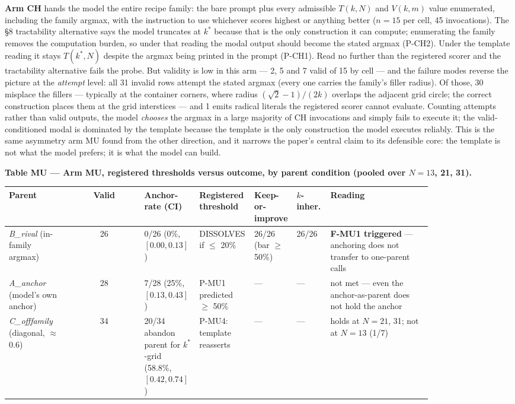 \textbf{Arm CH} hands the model the entire recipe family: the bare prompt plus every admissible
$T(k, N)$ and $V(k, m)$ value enumerated, including the family argmax, with the instruction to
use whichever scores highest or anything better ($n = 15$ per cell, 45 invocations). The \S8
tractability alternative says the model truncates at $k^*$ because that is the only construction
it can compute; enumerating the family removes the computation burden, so under that reading
the modal output should become the stated argmax (P-CH2). Under the template reading it stays
$T(k^*, N)$ despite the argmax being printed in the prompt (P-CH1). Read no further than the
registered scorer and the tractability alternative fails the probe. But validity is low in this
arm --- 2, 5 and 7 valid of 15 by cell --- and the failure modes reverse the picture at the
\emph{attempt} level: all 31 invalid rows attempt the stated argmax (every one carries the family's
filler radius). Of those, 30 misplace the fillers --- typically at the container corners, where
radius $(\sqrt{2}-1)/(2k)$ overlaps the adjacent grid circle; the correct construction places them
at the grid interstices --- and 1 emits radical literals the registered scorer cannot evaluate.
Counting attempts rather than valid outputs, the model \emph{chooses} the argmax in a large
majority of CH invocations and simply fails to execute it; the valid-conditioned modal is
dominated by the template because the template is the only construction the model executes
reliably. This is the same asymmetry arm MU found from the other direction, and it narrows the
paper's central claim to its defensible core: the template is not what the model prefers; it is
what the model can build.

\textbf{Table MU --- Arm MU, registered thresholds versus outcome, by parent condition (pooled
over $N = 13$, 21, 31).}

\begin{center}
\begin{small}
\setlength{\tabcolsep}{3.5pt}
\begin{tabular}{@{}p{0.15\linewidth}cp{0.13\linewidth}p{0.13\linewidth}p{0.10\linewidth}p{0.08\linewidth}p{0.24\linewidth}@{}}
\toprule
Parent & Valid & Anchor-rate (CI) & Registered threshold & Keep-or-improve & $k$-inher. & Reading \\
\midrule
\emph{B\_rival} (in-family argmax) & 26 & 0/26 (0\%, $[0.00, 0.13]$) & DISSOLVES if $\le$ 20\% & 26/26 (bar $\ge$ 50\%) & 26/26 & \textbf{F-MU1 triggered} --- anchoring does not transfer to one-parent calls \\
\emph{A\_anchor} (model's own anchor) & 28 & 7/28 (25\%, $[0.13, 0.43]$) & P-MU1 predicted $\ge$ 50\% & --- & --- & not met --- even the anchor-as-parent does not hold the anchor \\
\emph{C\_offfamily} (diagonal, $\approx$0.6) & 34 & 20/34 abandon parent for $k^*$-grid (58.8\%, $[0.42, 0.74]$) & P-MU4: template reasserts & --- & --- & holds at $N = 21$, 31; not at $N = 13$ (1/7) \\
\bottomrule
\end{tabular}
\end{small}
\end{center}

